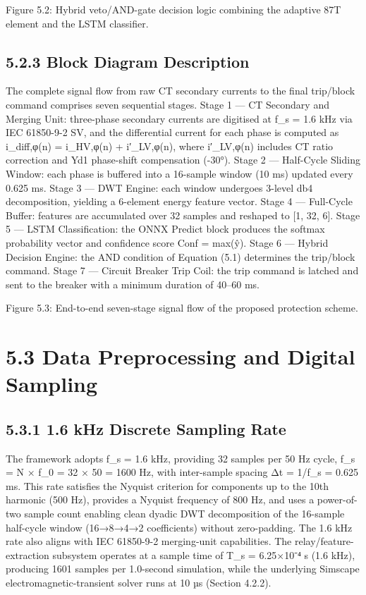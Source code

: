 Figure 5.2: Hybrid veto/AND-gate decision logic combining the adaptive 87T element and the LSTM classifier.


\subsection{5.2.3  Block Diagram Description}
The complete signal flow from raw CT secondary currents to the final trip/block command comprises seven sequential stages. Stage 1 --- CT Secondary and Merging Unit: three-phase secondary currents are digitised at f\_s = 1.6 kHz via IEC 61850-9-2 SV, and the differential current for each phase is computed as i\_diff,φ(n) = i\_HV,φ(n) + i′\_LV,φ(n), where i′\_LV,φ(n) includes CT ratio correction and Yd1 phase-shift compensation (-30°). Stage 2 --- Half-Cycle Sliding Window: each phase is buffered into a 16-sample window (10 ms) updated every 0.625 ms. Stage 3 --- DWT Engine: each window undergoes 3-level db4 decomposition, yielding a 6-element energy feature vector. Stage 4 --- Full-Cycle Buffer: features are accumulated over 32 samples and reshaped to [1, 32, 6]. Stage 5 --- LSTM Classification: the ONNX Predict block produces the softmax probability vector and confidence score Conf = max(ŷ). Stage 6 --- Hybrid Decision Engine: the AND condition of Equation (5.1) determines the trip/block command. Stage 7 --- Circuit Breaker Trip Coil: the trip command is latched and sent to the breaker with a minimum duration of 40--60 ms.

Figure 5.3: End-to-end seven-stage signal flow of the proposed protection scheme.


\section{5.3  Data Preprocessing and Digital Sampling}

\subsection{5.3.1  1.6 kHz Discrete Sampling Rate}
The framework adopts f\_s = 1.6 kHz, providing 32 samples per 50 Hz cycle, f\_s = N × f\_0 = 32 × 50 = 1600 Hz, with inter-sample spacing Δt = 1/f\_s = 0.625 ms. This rate satisfies the Nyquist criterion for components up to the 10th harmonic (500 Hz), provides a Nyquist frequency of 800 Hz, and uses a power-of-two sample count enabling clean dyadic DWT decomposition of the 16-sample half-cycle window (16→8→4→2 coefficients) without zero-padding. The 1.6 kHz rate also aligns with IEC 61850-9-2 merging-unit capabilities. The relay/feature-extraction subsystem operates at a sample time of T\_s = 6.25×10⁻⁴ s (1.6 kHz), producing 1601 samples per 1.0-second simulation, while the underlying Simscape electromagnetic-transient solver runs at 10 µs (Section 4.2.2).


